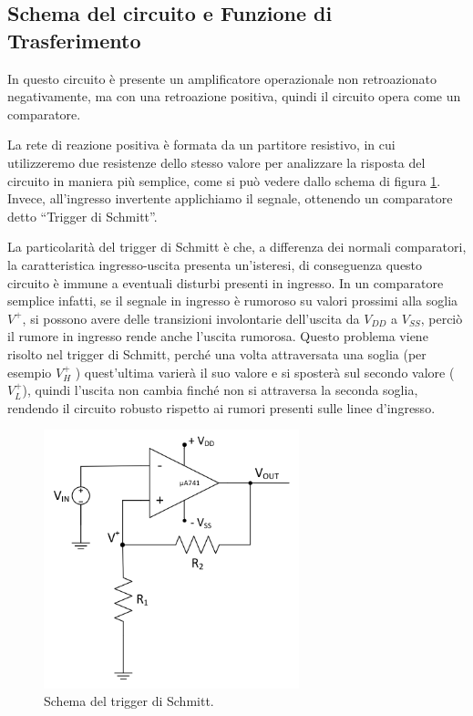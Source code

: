 \documentclass{report}
\begin{document}
\subsection{Schema del circuito e Funzione di Trasferimento}
In questo circuito è presente un amplificatore operazionale non retroazionato negativamente, ma con una retroazione positiva, quindi il circuito opera come un comparatore.\par
La rete di reazione positiva è formata da un partitore resistivo, in cui utilizzeremo due resistenze dello stesso valore per analizzare la risposta del circuito in maniera più semplice, come si può vedere dallo schema di figura \ref{figura:schema2}. Invece, all'ingresso invertente applichiamo il segnale, ottenendo un comparatore detto ``Trigger di Schmitt''.\par
La particolarità del trigger di Schmitt è che, a differenza dei normali comparatori, la caratteristica ingresso-uscita presenta un'isteresi, di conseguenza questo circuito è immune a eventuali disturbi presenti in ingresso. In un comparatore semplice infatti, se il segnale in ingresso è rumoroso su valori prossimi alla soglia ${V^+}$, si possono avere delle transizioni involontarie dell'uscita da ${V_{DD}}$ a ${V_{SS}}$, perciò il rumore in ingresso rende anche l'uscita rumorosa. Questo problema viene risolto nel trigger di Schmitt, perché una volta attraversata una soglia (per esempio ${V_H^+}$ ) quest'ultima varierà il suo valore e si sposterà sul secondo valore (${V_L^+}$), quindi l'uscita non cambia finché non si attraversa la seconda soglia, rendendo il circuito robusto rispetto ai rumori presenti sulle linee d'ingresso.\par
\begin{figure}[h]
	\centering
	\includegraphics[height=7.5cm]{immagini/schema2}
	\caption{Schema del trigger di Schmitt.}
	\label{figura:schema2}
\end{figure}
\end{document}
